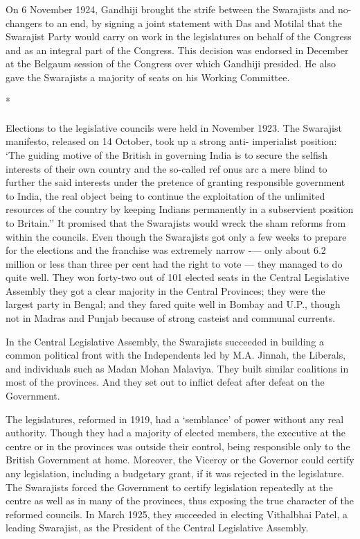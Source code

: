 On 6 November 1924, Gandhiji brought the strife between the Swarajists and no-changers to an end, by signing a joint statement with Das and Motilal that the Swarajist Party would carry on work in the legislatures on behalf of the Congress and as an integral part of the Congress. This decision was endorsed in December at the Belgaum session of the Congress over which Gandhiji presided. He also gave the Swarajists a majority of seats on his Working Committee.

\begin{center}*\end{center}

\paragraph*{}


Elections to the legislative councils were held in November 1923. The Swarajist manifesto, released on 14 October, took up a strong anti- imperialist position: `The guiding motive of the British in governing India is to secure the selfish interests of their own country and the so-called ref onus arc a mere blind to further the said interests under the pretence of granting responsible government to India, the real object being to continue the exploitation of the unlimited resources of the country by keeping Indians permanently in a subservient position to Britain.'' It promised that the Swarajists would wreck the sham reforms from within the councils. Even though the Swarajists got only a few weeks to prepare for the elections and the franchise was extremely narrow -— only about 6.2 million or less than three per cent had the right to vote — they managed to do quite well. They won forty-two out of 101 elected seats in the Central Legislative Assembly they got a clear majority in the Central Provinces; they were the largest party in Bengal; and they fared quite well in Bombay and U.P., though not in Madras and Punjab because of strong casteist and communal currents.

In the Central Legislative Assembly, the Swarajists succeeded in building a common political front with the Independents led by M.A. Jinnah, the Liberals, and individuals such as Madan Mohan Malaviya. They built similar coalitions in most of the provinces. And they set out to inflict defeat after defeat on the Government.

The legislatures, reformed in 1919, had a `semblance' of power without any real authority. Though they had a majority of elected members, the executive at the centre or in the provinces was outside their control, being responsible only to the British Government at home. Moreover, the Viceroy or the Governor could certify any legislation, including a budgetary grant, if it was rejected in the legislature. The Swarajists forced the Government to certify legislation repeatedly at the centre as well as in many of the provinces, thus exposing the true character of the reformed councils. In March 1925, they succeeded in electing Vithalbhai Patel, a leading Swarajist, as the President of the Central Legislative Assembly.

